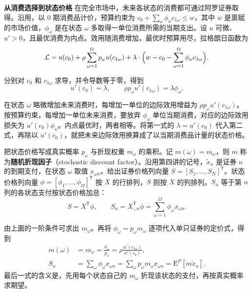\textbf{从消费选择到状态价格}\quad
在完全市场中，未来各状态的消费都可通过阿罗证券取得。沿用，以 $0$ 期消费品计价，预算约束为 $c_0+\sum_\omega\phi_\omega c_{1\omega}\le w$，其中 $w$ 是禀赋的市场价值，$\phi_\omega$ 是在状态 $\omega$ 多取得一单位消费所需的当期支出。设 $u$ 可微、$u'>0$，且最优消费为内点。效用随消费增加，最优时预算用尽，拉格朗日函数为
\[
 \mathcal L
 =u(c_0)+\rho\sum_{\omega=1}^{\Omega}p_\omega u(c_{1\omega})
  +\lambda\cdot\Bigl(w-c_0-\sum_{\omega=1}^{\Omega}\phi_\omega c_{1\omega}\Bigr).
\]

分别对 $c_0$ 和 $c_{1\omega}$ 求导，并令导数等于零，得到
\[
 u'(c_0)=\lambda,\qquad
 \rho p_\omega u'(c_{1\omega})=\lambda\phi_\omega.
\]

在状态 $\omega$ 略微增加未来消费时，每增加一单位的边际效用增益为 $\rho p_\omega u'(c_{1\omega})$。按预算约束，每增加一单位未来消费，要放弃 $\phi_\omega$ 单位当期消费，对应的边际效用损失为 $u'(c_0)\phi_\omega$。内点最优时，两者相等。将第一式的 $\lambda=u'(c_0)$ 代入第二式，再除以 $u'(c_0)$，就把未来边际效用换算成了以当期消费品计量的状态价格。

\begin{tcolorbox}[knowledge,title=随机折现因子与证券定价]
把状态价格写成真实概率 $p_\omega$ 与折现权重 $m_\omega$ 的乘积。记 $m(\omega)=m_\omega$，则 $m$ 称为\textbf{随机折现因子}（stochastic discount factor）。沿用第四讲的记号，$\tilde x_n$ 是证券 $n$ 的到期支付，在状态 $\omega$ 取值 $x_{\omega n}$。给出证券价格列向量 $S=[S_1,\ldots,S_N]^{\mathsf T}$。状态价格列向量 $\phi=[\phi_1,\ldots,\phi_\Omega]^{\mathsf T}$ 按 $X$ 的行排列，$S$ 则按 $X$ 的列排列。$S_n$ 等于第 $n$ 列的各状态支付按状态价格加总：
\[
 S=X^{\mathsf T}\phi,
 \qquad
 S_n=X_{\cdot,n}^{\mathsf T}\phi
    =\sum_{\omega=1}^{\Omega}\phi_\omega x_{\omega n}.
\]

由上面的一阶条件可求出 $m_\omega$。再将 $\phi_\omega=p_\omega m_\omega$ 逐项代入单只证券的定价式，得到
\begin{equation*}
 \begin{aligned}
 m(\omega)&=m_\omega=\frac{\phi_\omega}{p_\omega}
   =\rho\frac{u'(c_{1\omega})}{u'(c_0)},\\
 S_n
 &=\sum_\omega\phi_\omega x_{\omega n}
   =\sum_\omega p_\omega m_\omega x_{\omega n}
   =\mathrm E^P[m\tilde x_n].
 \end{aligned}
 \tag{6.I}\label{eq:wj-six-sdf}
\end{equation*}
最后一式的含义是，先用每个状态自己的 $m_\omega$ 折现该状态的支付，再按真实概率求期望。
\end{tcolorbox}

